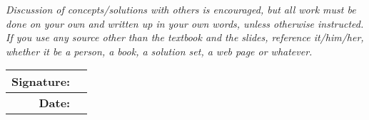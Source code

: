 {{{\em Discussion of concepts/solutions with others is encouraged, but
all work must be done on your own and written up in 
your own words, unless otherwise instructed. If you 
use any source other than the textbook and the slides, reference 
it/him/her, whether it be a person, a book, a solution set, 
a web page or whatever.}

\bigskip

\noindent
\begin{tabular}[t]{|r|p{7cm}|}
\hline
{\bf Signature:} &\\
\hline
{\bf Date:} &\\
\hline
\end{tabular}
}}
